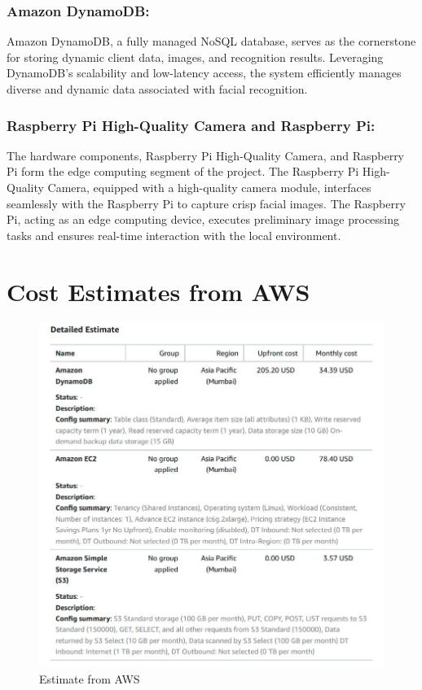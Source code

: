 \documentclass[11pt]{article}
\begin{document}
\subsubsection{Amazon DynamoDB:}
Amazon DynamoDB, a fully managed NoSQL database, serves as the cornerstone for storing dynamic client data, images, and recognition results. Leveraging DynamoDB's scalability and low-latency access, the system efficiently manages diverse and dynamic data associated with facial recognition.

\subsubsection{Raspberry Pi High-Quality Camera and Raspberry Pi:}
The hardware components, Raspberry Pi High-Quality Camera, and Raspberry Pi form the edge computing segment of the project. The Raspberry Pi High-Quality Camera, equipped with a high-quality camera module, interfaces seamlessly with the Raspberry Pi to capture crisp facial images. The Raspberry Pi, acting as an edge computing device, executes preliminary image processing tasks and ensures real-time interaction with the local environment.

\section{Cost Estimates from AWS}

\begin{figure}[H]
    \centering
    \includegraphics[width=.95\textwidth]{aws estimate.jpg}
    \caption{Estimate from AWS}
\end{figure}
\end{document}
